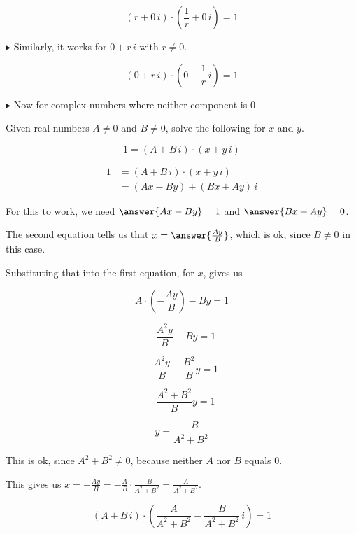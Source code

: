 \documentclass{ximera}
\begin{document}
\[   (r + 0 \, i) \cdot \left(\frac{1}{r} + 0 \, i \right) = 1        \]







$\blacktriangleright$  Similarly, it works for $0 + r \, i$ with $r \ne 0$.


\[   (0 + r \, i) \cdot \left(0 - \frac{1}{r} \, i \right) = 1        \]





$\blacktriangleright$ Now for complex numbers where neither component is $0$


\begin{explanation}


Given real numbers $A \ne 0$ and $B \ne 0$, solve the following for $x$ and $y$.


\[       1 = (A + B \, i) \cdot (x + y \, i)            \]



\begin{align*}
1          & = (A + B \, i) \cdot (x + y \, i)      \\
           & = (Ax-By) + (Bx+Ay) \, i
\end{align*}


For this to work, we need $\answer{A x - B y} = 1$ and $\answer{B x + A y} = 0$.



The second equation tells us that $x = \answer{\frac{A y}{B}}$, which is ok, since $B \ne 0$ in this case.

Substituting that into the first equation, for $x$, gives us


\[   A \cdot \left(-\frac{A y}{B}\right) - B y = 1     \]


\[   -\frac{A^2 y}{B} - B y = 1     \]

\[   -\frac{A^2 y}{B} - \frac{B^2}{B} y = 1     \]


\[   -\frac{A^2 + B^2}{B} y = 1     \]


\[  y = \frac{-B}{A^2 + B^2}     \]

This is ok, since $A^2 + B^2 \ne 0$, because neither $A$ nor $B$ equals $0$.



This gives us $x = -\frac{A y}{B} = -\frac{A}{B} \cdot \frac{-B}{A^2 + B^2} = \frac{A}{A^2 + B^2} $.







\[       (A + B \, i) \cdot \left( \frac{A}{A^2 + B^2} - \frac{B}{A^2 + B^2} \, i \right) = 1            \]



\end{explanation}
\end{document}
